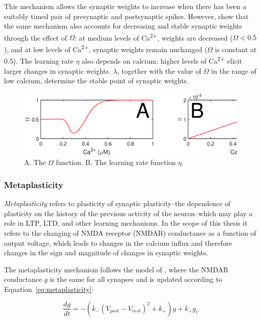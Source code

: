 \documentclass[a4paper,12pt]{report}
\theoremstyle{definition}
\begin{document}
This mechanism allows the synaptic weights to increase when there has been a suitably timed pair of presynaptic and postsynaptic spikes. However, \cite{shouval2002unified} show that the same mechanism also accounts for decreasing and stable synaptic weights through the effect of $\Omega$: at medium levels of Ca\textsuperscript{2+}, weights are decreased ($\Omega<0.5$), and at low levels of Ca\textsuperscript{2+}, synaptic weights remain unchanged ($\Omega$ is constant at 0.5). The learning rate $\eta$ also depends on calcium: higher levels of Ca\textsuperscript{2+} elicit larger changes in synaptic weights. $\lambda$, together with the value of $\Omega$ in the range of low calcium, determine the stable point of synaptic weights.

\begin{figure}[h]
    \includegraphics[width=\textwidth]{figures/methods_eta_omega.eps}
    \caption{A. The $\Omega$ function. B. The learning rate function $\eta$.}
    \label{fig:methods_eta_omega}
\end{figure}


\subsubsection{Metaplasticity}
\emph{Metaplasticity} refers to plasticity of synaptic plasticity--the dependence of plasticity on the history of the previous activity of the neuron--which may play a role in LTP, LTD, and other learning mechanisms. In the scope of this thesis it refers to the changing of NMDA receptor (NMDAR) conductance as a function of output voltage, which leads to changes in the calcium influx and therefore changes in the sign and magnitude of changes in synaptic weights.

The metaplasticity mechanism follows the model of \cite{yeung2004synaptic}, where the NMDAR conductance $g$ is the same for all synapses and is updated according to Equation~\ref{eq:metaplasticity}:

\begin{equation}
\frac{dg}{dt}=-(k_- (V_{post}-V_{rest})^2 + k_+)g + k_+ g_t
\label{eq:metaplasticity}
\end{equation}
\end{document}
